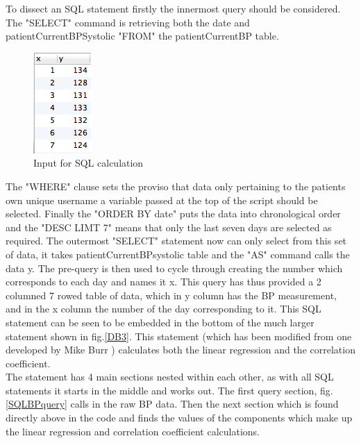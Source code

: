 \documentclass[11pt]{article}
\begin{document}
To dissect an SQL statement firstly the innermost query should be considered. The "SELECT" command is retrieving both the date and patientCurrentBPSystolic "FROM" the patientCurrentBP table. 
\begin{figure}
\centering
\includegraphics[scale=0.4]{DB2.png}
\caption{Input for SQL calculation \label{DB2}} 
\end{figure} 
The "WHERE" clause sets the proviso that data only pertaining to the patients own unique username a variable passed at the top of the script should be selected. Finally the "ORDER BY date" puts the data into chronological order and the "DESC LIMT 7" means that only the last seven days are selected as required. The outermost "SELECT" statement now can only select from this set of data, it takes patientCurrentBPsystolic table and the "AS" command calls the data y. The pre-query is then used to cycle through creating the number which corresponds to each day and names it x. This query has thus provided a 2 columned 7 rowed table of data, which in y column has the BP measurement, and in the x column the number of the day corresponding to it. This SQL statement can be seen to be embedded in the bottom of the much larger statement shown in fig.\ref{DB3}. This statement (which has been modified from one developed by Mike Burr \cite{Mike}) calculates both the linear regression and the correlation coefficient. 
\\ \indent
The statement has 4 main sections nested within each other, as with all SQL statements it starts in the middle and works out. The first query section, fig.\ref{SQLBPquery} calls in the raw BP data. Then the next section which is found directly above in the code and finds the values of the components which make up the linear regression and correlation coefficient calculations. 
\end{document}
